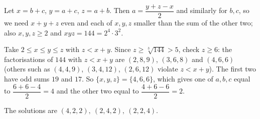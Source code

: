 Let $x=b+c$, $y=a+c$, $z=a+b$. Then $a=\dfrac{y+z-x}{2}$ and similarly for $b,c$, so we need $x+y+z$ even and each of $x,y,z$ smaller than the sum of the other two; also $x,y,z\ge2$ and $xyz=144=2^4\cdot3^2$.

Take $2\le x\le y\le z$ with $z<x+y$. Since $z\ge\sqrt[3]{144}>5$, check $z\ge6$: the factorisations of $144$ with $z<x+y$ are $(2,8,9)$, $(3,6,8)$ and $(4,6,6)$ (others such as $(4,4,9)$, $(3,4,12)$, $(2,6,12)$ violate $z<x+y$). The first two have odd sums $19$ and $17$. So $\{x,y,z\}=\{4,6,6\}$, which gives one of $a,b,c$ equal to $\dfrac{6+6-4}{2}=4$ and the other two equal to $\dfrac{4+6-6}{2}=2$.

The solutions are $\boxed{(4,2,2),\ (2,4,2),\ (2,2,4)}$.
